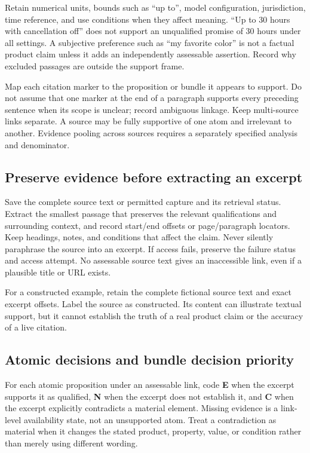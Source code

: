 \documentclass[10pt,a4paper]{article}
\begin{document}
Retain numerical units, bounds such as ``up to'', model configuration, jurisdiction, time reference, and use conditions when they affect meaning. ``Up to 30 hours with cancellation off'' does not support an unqualified promise of 30 hours under all settings. A subjective preference such as ``my favorite color'' is not a factual product claim unless it adds an independently assessable assertion. Record why excluded passages are outside the support frame.

Map each citation marker to the proposition or bundle it appears to support. Do not assume that one marker at the end of a paragraph supports every preceding sentence when its scope is unclear; record ambiguous linkage. Keep multi-source links separate. A source may be fully supportive of one atom and irrelevant to another. Evidence pooling across sources requires a separately specified analysis and denominator.

\subsection{Preserve evidence before extracting an excerpt}
Save the complete source text or permitted capture and its retrieval status. Extract the smallest passage that preserves the relevant qualifications and surrounding context, and record start/end offsets or page/paragraph locators. Keep headings, notes, and conditions that affect the claim. Never silently paraphrase the source into an excerpt. If access fails, preserve the failure status and access attempt. No assessable source text gives an inaccessible link, even if a plausible title or URL exists.

For a constructed example, retain the complete fictional source text and exact excerpt offsets. Label the source as constructed. Its content can illustrate textual support, but it cannot establish the truth of a real product claim or the accuracy of a live citation.

\subsection{Atomic decisions and bundle decision priority}
For each atomic proposition under an assessable link, code \textbf{E} when the excerpt supports it as qualified, \textbf{N} when the excerpt does not establish it, and \textbf{C} when the excerpt explicitly contradicts a material element. Missing evidence is a link-level availability state, not an unsupported atom. Treat a contradiction as material when it changes the stated product, property, value, or condition rather than merely using different wording.
\end{document}
